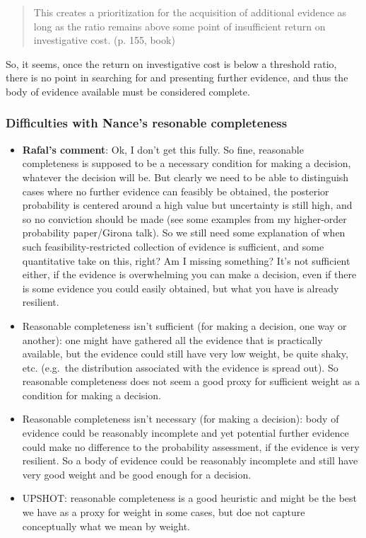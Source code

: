 \documentclass[
  10pt,
  dvipsnames,enabledeprecatedfontcommands]{scrartcl}
\begin{document}
\begin{quote}
This creates a prioritization for the acquisition of additional evidence as long as the ratio remains above some point of insufficient return on investigative cost. (p. 155, book)
\end{quote}

So, it seems, once the return on investigative cost is below a threshold
ratio, there is no point in searching for and presenting further
evidence, and thus the body of evidence available must be considered
complete.

\hypertarget{difficulties-with-nances-resonable-completeness}{%
\subsubsection{Difficulties with Nance's resonable
completeness}\label{difficulties-with-nances-resonable-completeness}}

\begin{itemize}
\item
  \textbf{Rafal's comment}: Ok, I don't get this fully. So fine,
  reasonable completeness is supposed to be a necessary condition for
  making a decision, whatever the decision will be. But clearly we need
  to be able to distinguish cases where no further evidence can feasibly
  be obtained, the posterior probability is centered around a high value
  but uncertainty is still high, and so no conviction should be made
  (see some examples from my higher-order probability paper/Girona
  talk). So we still need some explanation of when such
  feasibility-restricted collection of evidence is sufficient, and some
  quantitative take on this, right? Am I missing something? It's not
  sufficient either, if the evidence is overwhelming you can make a
  decision, even if there is some evidence you could easily obtained,
  but what you have is already resilient.
\item
  Reasonable completeness isn't sufficient (for making a decision, one
  way or another): one might have gathered all the evidence that is
  practically available, but the evidence could still have very low
  weight, be quite shaky, etc. (e.g.~the distribution associated with
  the evidence is spread out). So reasonable completeness does not seem
  a good proxy for sufficient weight as a condition for making a
  decision.
\item
  Reasonable completeness isn't necessary (for making a decision): body
  of evidence could be reasonably incomplete and yet potential further
  evidence could make no difference to the probability assessment, if
  the evidence is very resilient. So a body of evidence could be
  reasonably incomplete and still have very good weight and be good
  enough for a decision.
\item
  UPSHOT: reasonable completeness is a good heuristic and might be the
  best we have as a proxy for weight in some cases, but doe not capture
  conceptually what we mean by weight.
\end{itemize}
\end{document}
